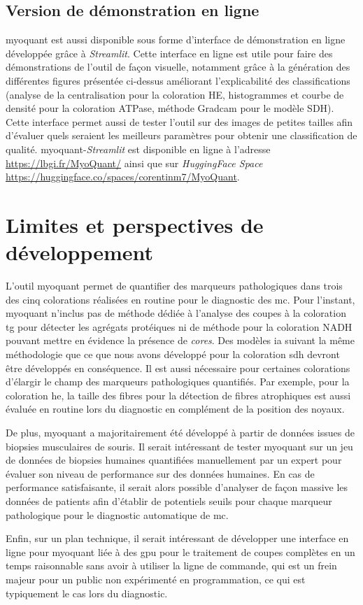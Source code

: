 \subsection{Version de démonstration en ligne}
\gls{myoquant} est aussi disponible sous forme d'interface de démonstration en ligne développée grâce à \textit{Streamlit}. Cette interface en ligne est utile pour faire des démonstrations de l'outil de façon visuelle, notamment grâce à la génération des différentes figures présentée ci-dessus améliorant l'explicabilité des classifications (analyse de la centralisation pour la coloration HE, histogrammes et courbe de densité pour la coloration ATPase, méthode Gradcam pour le modèle SDH). Cette interface permet aussi de tester l'outil sur des images de petites tailles afin d'évaluer quels seraient les meilleurs paramètres pour obtenir une classification de qualité. \gls{myoquant}-\textit{Streamlit} est disponible en ligne à l'adresse \href{https://lbgi.fr/MyoQuant/}{https://lbgi.fr/MyoQuant/} ainsi que sur \textit{HuggingFace Space} \href{https://huggingface.co/spaces/corentinm7/MyoQuant}{https://huggingface.co/spaces/corentinm7/MyoQuant}.

\section{Limites et perspectives de développement}
L'outil \gls{myoquant} permet de quantifier des marqueurs pathologiques dans trois des cinq colorations réalisées en routine pour le diagnostic des \gls{mc}. Pour l'instant, \gls{myoquant} n'inclus pas de méthode dédiée à l'analyse des coupes à la coloration \gls{tg} pour détecter les agrégats protéiques ni de méthode pour la coloration NADH pouvant mettre en évidence la présence de \textit{cores}. Des modèles \gls{ia} suivant la même méthodologie que ce que nous avons développé pour la coloration \gls{sdh} devront être développés en conséquence. Il est aussi nécessaire pour certaines colorations d'élargir le champ des marqueurs pathologiques quantifiés. Par exemple, pour la coloration \gls{he}, la taille des fibres pour  la détection de fibres atrophiques est aussi évaluée en routine lors du diagnostic en complément de la position des noyaux.

De plus, \gls{myoquant} a majoritairement été développé à partir de données issues de biopsies musculaires de souris. Il serait intéressant de tester \gls{myoquant} sur un jeu de données de biopsies humaines quantifiées manuellement par un expert pour évaluer son niveau de performance sur des données humaines. En cas de performance satisfaisante, il serait alors possible d'analyser de façon massive les données de patients afin d'établir de potentiels seuils pour chaque marqueur pathologique pour le diagnostic automatique de \gls{mc}.

 Enfin, sur un plan technique, il serait intéressant de développer une interface en ligne pour \gls{myoquant} liée à des \gls{gpu} pour le traitement de coupes complètes en un temps raisonnable sans avoir à utiliser la ligne de commande, qui est un frein majeur pour un public non expérimenté en programmation, ce qui est typiquement le cas lors du diagnostic.